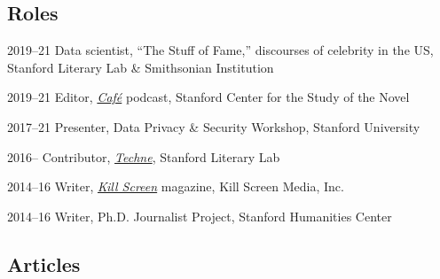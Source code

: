 \documentclass[12pt,letterpaper]{report}
\begin{document}
\subsection*{Roles}

\begin{tablist}
	\item[2019--21] \tab{}Data scientist, \enquote{The Stuff of Fame,} discourses of celebrity in the US, Stanford Literary Lab \& Smithsonian Institution
	\item[2019--21] \tab{}Editor, \href{https://novel.stanford.edu/csn-cafe}{\emph{Café}} podcast, Stanford Center for the Study of the Novel
	\item[2017--21] \tab{}Presenter, Data Privacy \& Security Workshop, Stanford University
	\item[2016--] \tab{}Contributor, \href{https://litlab.stanford.edu/techne/}{\emph{Techne}}, Stanford Literary Lab
	\item[2014--16] \tab{}Writer, \href{https://web.archive.org/web/20221003115514/https://killscreen.com/previously/author/erik-fredner/}{\emph{Kill Screen}} magazine, Kill Screen Media, Inc.
	\item[2014--16] \tab{}Writer, Ph.D. Journalist Project, Stanford Humanities Center
\end{tablist}

\subsection*{Articles}
\end{document}
